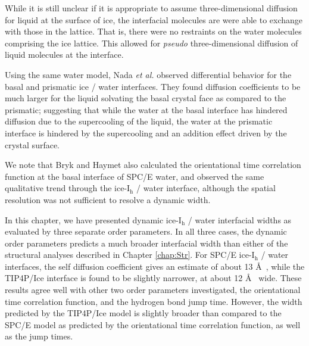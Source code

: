 While it is still unclear if it is appropriate to assume
three-dimensional diffusion for liquid at the surface of ice, the
interfacial molecules are were able to exchange with those in the
lattice. That is, there were no restraints on the water molecules
comprising the ice lattice. This allowed for \textit{pseudo}
three-dimensional diffusion of liquid molecules at the interface.

Using the same water model, Nada \textit{et al.}  observed
differential behavior for the basal and prismatic ice / water
interfaces. They found diffusion coefficients to be much larger for
the liquid solvating the basal crystal face as compared to the
prismatic; suggesting that while the water at the basal interface has
hindered diffusion due to the supercooling of the liquid, the water at
the prismatic interface is hindered by the supercooling and an
addition effect driven by the crystal surface.

 
We note that Bryk and Haymet also calculated the orientational time
correlation function at the basal interface of SPC/E
water,\cite{Bryk2002} and observed the same qualitative trend through
the ice-I$_\mathrm{h}$ / water interface, although the spatial resolution was not
sufficient to resolve a dynamic width.


In this chapter, we have presented dynamic ice-I$_\mathrm{h}$ / water
interfacial widths as evaluated by three separate order parameters. In
all three cases, the dynamic order parameters predicts a much broader
interfacial width than either of the structural analyses described in
Chapter \ref{chap:Str}.  For SPC/E ice-I$_\mathrm{h}$ / water
interfaces, the self diffusion coefficient gives an estimate of about
13 \AA~, while the TIP4P/Ice interface is found to be slightly
narrower, at about  12 \AA~ wide. These
results agree well with other two order parameters investigated, the
orientational time correlation function, and the hydrogen bond jump
time. However, the width predicted by the TIP4P/Ice model
is slightly broader than compared to the SPC/E model as predicted by
the orientational time correlation function, as well as the jump times.
